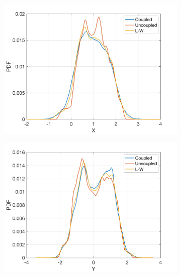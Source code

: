\documentclass[12pt]{article}
\begin{document}
\begin{figure}[H]
	\centering
	\begin{subfigure}[b]{0.3\textwidth}
		\centering
		\includegraphics[width=\textwidth]{plots/l84l63/pdf_x_5.png}
	\end{subfigure}
	\hfill
	\begin{subfigure}[b]{0.3\textwidth}
		\centering
		\includegraphics[width=\textwidth]{plots/l84l63/pdf_y_5.png}
	\end{subfigure}
	\hfill
	\begin{subfigure}[b]{0.3\textwidth}
		\centering

\end{subfigure}
\end{figure}
\end{document}

